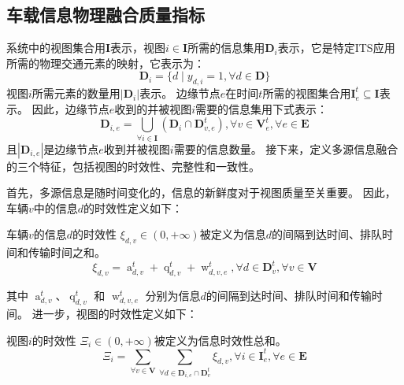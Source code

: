 \subsection[\hspace{-2pt}车载信息物理融合质量指标]{{ \hspace{-8pt}车载信息物理融合质量指标}}
系统中的视图集合用$\mathbf{I}$表示，视图$i \in \mathbf{I}$所需的信息集用$\mathbf{D}_{i}$表示，它是特定ITS应用所需的物理交通元素的映射，它表示为：
\begin{equation}
	\mathbf{D}_{i} = \{d \mid y_{d, i} = 1, \forall d \in \mathbf{D} \}
\end{equation}
视图$i$所需元素的数量用$|\mathbf{D}_{i}|$表示。
边缘节点$e$在时间$t$所需的视图集合用$\mathbf{I}_e^t \subseteq \mathbf{I}$表示。
因此，边缘节点$e$收到的并被视图$i$需要的信息集用下式表示：
\begin{equation}
    \mathbf{D}_{i, e}=\bigcup_{\forall i \in \mathbf{I}}\left(\mathbf{D}_i \cap \mathbf{D}_{v, e}^t\right), \forall v \in \mathbf{V}_e^t, \forall e \in \mathbf{E}
\end{equation}
且$| \mathbf{D}_{i, e} |$是边缘节点$e$收到并被视图$i$需要的信息数量。
接下来，定义多源信息融合的三个特征，包括视图的时效性、完整性和一致性。

首先，多源信息是随时间变化的，信息的新鲜度对于视图质量至关重要。
因此，车辆$v$中的信息$d$的时效性定义如下：
\begin{definition}
	车辆$v$的信息$d$的时效性 $\xi_{d,v} \in (0, +\infty)$被定义为信息$d$的间隔到达时间、排队时间和传输时间之和。
	\begin{equation}
    	\xi_{d, v} = \operatorname{a}_{d, v}^t + \operatorname{q}_{d, v}^t + \operatorname{w}_{d, v, e}^t, \forall d \in \mathbf{D}_v^t, \forall v \in \mathbf{V}
	\end{equation}
\end{definition}
\noindent 其中 $\operatorname{a}_{d, v}^t$、$\operatorname{q}_{d, v}^t$ 和 $\operatorname{w}_{d, v, e}^t$ 分别为信息$d$的间隔到达时间、排队时间和传输时间。
进一步，视图的时效性定义如下：
\begin{definition}
视图$i$的时效性 $\Xi_{i} \in (0,+\infty)$被定义为信息时效性总和。
	\begin{equation}
    	\Xi_{i} = \sum_{\forall v \in \mathbf{V}} \sum_{\forall d \in \mathbf{D}_{i, e} \cap \mathbf{D}_v^t } \xi_{d, v}, \forall i \in \mathbf{I}_e^t, \forall e \in \mathbf{E}
	\end{equation}
\end{definition}

